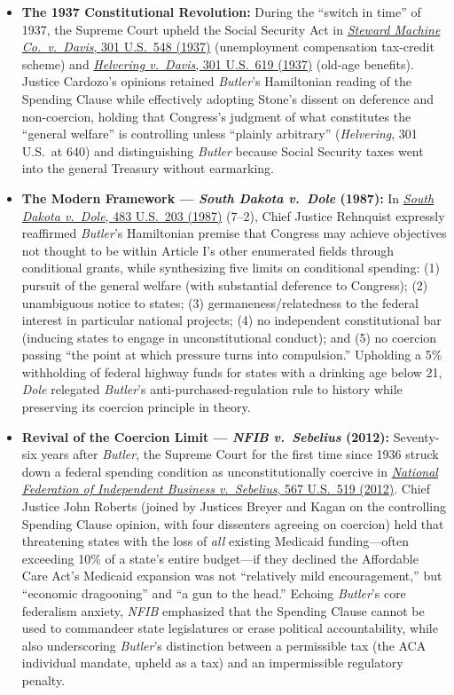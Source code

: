 \documentclass[12pt]{article}
\begin{document}
\begin{itemize}
  \item \textbf{The 1937 Constitutional Revolution:} During the ``switch in time'' of 1937, the Supreme Court upheld the Social Security Act in \href{https://supreme.justia.com/cases/federal/us/301/548/}{\textit{Steward Machine Co.\ v.\ Davis}, 301 U.S.\ 548 (1937)} (unemployment compensation tax-credit scheme) and \href{https://supreme.justia.com/cases/federal/us/301/619/}{\textit{Helvering v.\ Davis}, 301 U.S.\ 619 (1937)} (old-age benefits). Justice Cardozo's opinions retained \textit{Butler}'s Hamiltonian reading of the Spending Clause while effectively adopting Stone's dissent on deference and non-coercion, holding that Congress's judgment of what constitutes the ``general welfare'' is controlling unless ``plainly arbitrary'' (\textit{Helvering}, 301 U.S.\ at 640) and distinguishing \textit{Butler} because Social Security taxes went into the general Treasury without earmarking.
  \item \textbf{The Modern Framework --- \textit{South Dakota v.\ Dole} (1987):} In \href{https://supreme.justia.com/cases/federal/us/483/203/}{\textit{South Dakota v.\ Dole}, 483 U.S.\ 203 (1987)} (7--2), Chief Justice Rehnquist expressly reaffirmed \textit{Butler}'s Hamiltonian premise that Congress may achieve objectives not thought to be within Article I's other enumerated fields through conditional grants, while synthesizing five limits on conditional spending: (1) pursuit of the general welfare (with substantial deference to Congress); (2) unambiguous notice to states; (3) germaneness/relatedness to the federal interest in particular national projects; (4) no independent constitutional bar (inducing states to engage in unconstitutional conduct); and (5) no coercion passing ``the point at which pressure turns into compulsion.'' Upholding a 5\% withholding of federal highway funds for states with a drinking age below 21, \textit{Dole} relegated \textit{Butler}'s anti-purchased-regulation rule to history while preserving its coercion principle in theory.
  \item \textbf{Revival of the Coercion Limit --- \textit{NFIB v.\ Sebelius} (2012):} Seventy-six years after \textit{Butler}, the Supreme Court for the first time since 1936 struck down a federal spending condition as unconstitutionally coercive in \href{https://supreme.justia.com/cases/federal/us/567/519/}{\textit{National Federation of Independent Business v.\ Sebelius}, 567 U.S.\ 519 (2012)}. Chief Justice John Roberts (joined by Justices Breyer and Kagan on the controlling Spending Clause opinion, with four dissenters agreeing on coercion) held that threatening states with the loss of \textit{all} existing Medicaid funding---often exceeding 10\% of a state's entire budget---if they declined the Affordable Care Act's Medicaid expansion was not ``relatively mild encouragement,'' but ``economic dragooning'' and ``a gun to the head.'' Echoing \textit{Butler}'s core federalism anxiety, \textit{NFIB} emphasized that the Spending Clause cannot be used to commandeer state legislatures or erase political accountability, while also underscoring \textit{Butler}'s distinction between a permissible tax (the ACA individual mandate, upheld as a tax) and an impermissible regulatory penalty.

\end{itemize}
\end{document}
